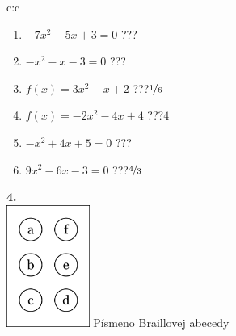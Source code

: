 \documentclass[10pt]{report}
\begin{document}
\begin{tabular}{c:c}
\begin{minipage}[c][104.5mm][t]{0.5\linewidth}
\begin{center}
\begin{minipage}{0.79\linewidth}
\begin{center}
\begin{varwidth}{\linewidth}
\begin{enumerate}
\Large
\item $-7x^2-5x+3=0$\quad \dotfill\; ???\;\dotfill {}
\item $-x^2-x-3=0$\quad \dotfill\; ???\;\dotfill {}
\item $f(x)=3x^2-x+2$\quad \dotfill\; ???\;\dotfill \quad $\nicefrac{1}{6}$
\item $f(x)=-2x^2-4x+4$\quad \dotfill\; ???\;\dotfill \quad $4$
\item $-x^2+4x+5=0$\quad \dotfill\; ???\;\dotfill {}
\item $9x^2-6x-3=0$\quad \dotfill\; ???\;\dotfill \quad $\nicefrac{4}{3}$
\end{enumerate}
\end{varwidth}
\end{center}
\end{minipage}
\begin{minipage}{0.20\linewidth}
\begin{center}
{\Huge\bfseries 4.} \\[2mm]
\includegraphics[height=40mm]{../images/braille.png}
{\small Písmeno Braillovej abecedy}
\end{center}
\end{minipage}
\end{center}
\end{minipage}
%
\end{tabular}
\newpage
\thispagestyle{empty}
\end{document}
